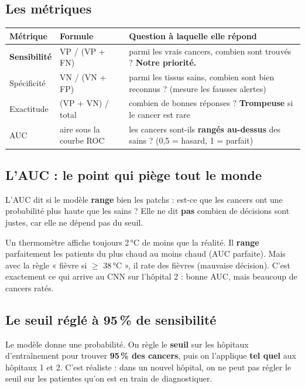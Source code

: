 \documentclass[11pt,a4paper]{article}
\begin{document}
\subsection{Les métriques}
\begin{table}[H]
\centering\small
\begin{tabularx}{\textwidth}{llX}
\toprule
\textbf{Métrique} & \textbf{Formule} & \textbf{Question à laquelle elle répond} \\
\midrule
\textbf{Sensibilité} & VP / (VP + FN) & parmi les vrais cancers, combien sont trouvés ? \textbf{Notre priorité.} \\
Spécificité & VN / (VN + FP) & parmi les tissus sains, combien sont bien reconnus ? (mesure les fausses alertes) \\
Exactitude & (VP + VN) / total & combien de bonnes réponses ? \textbf{Trompeuse} si le cancer est rare \\
AUC & aire sous la courbe ROC & les cancers sont-ils \textbf{rangés au-dessus} des sains ? (0,5 = hasard, 1 = parfait) \\
\bottomrule
\end{tabularx}
\end{table}

\subsection{L'AUC : le point qui piège tout le monde}
\begin{piege}
L'AUC dit si le modèle \textbf{range} bien les patchs : est-ce que les cancers ont une probabilité plus haute que les sains ?
Elle ne dit \textbf{pas} combien de décisions sont justes, car elle ne dépend pas du seuil.
\end{piege}

\begin{analogie}
Un thermomètre affiche toujours 2\,°C de moins que la réalité. Il \textbf{range} parfaitement les patients du plus chaud au moins
chaud (AUC parfaite). Mais avec la règle « fièvre si $\geq$ 38\,°C », il rate des fièvres (mauvaise décision). C'est exactement
ce qui arrive au CNN sur l'hôpital 2 : bonne AUC, mais beaucoup de cancers ratés.
\end{analogie}

\subsection{Le seuil réglé à 95\,\% de sensibilité}
Le modèle donne une probabilité. On règle le \textbf{seuil} sur les hôpitaux d'entraînement pour trouver \textbf{95\,\% des cancers},
puis on l'applique \textbf{tel quel} aux hôpitaux 1 et 2. C'est réaliste : dans un nouvel hôpital, on ne peut pas régler le seuil sur
les patientes qu'on est en train de diagnostiquer.
\end{document}
